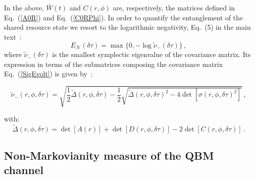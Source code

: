 \documentclass[prl,twocolumn,aps,floatfix,showpacs,tightenlines,superscriptaddress,amsmath,amssymb,amsfonts,10pt]{revtex4-1}
\begin{document}
In the above, $\bar{W}(t)$ and $C(r,\phi)$ are, respectively, the matrices defined in Eq.~(\ref{A0R}) and Eq.~(\ref{C0RPhi}).
In order to quantify the entanglement of the shared resource state we resort to the logarithmic negativity, Eq.~(5) in the main text~\cite{1751-8121-40-28-S01}:
\begin{displaymath}
E_{\mathcal{N}}(\delta\tau)=\max\{0,-\log\tilde{\nu}_-(\delta\tau)\} \, ,
\end{displaymath}
where $\tilde{\nu}_-(\delta\tau)$ is the smallest symplectic eigenvalue of the
covariance matrix. Its expression in terms of the submatrices composing the covariance matrix Eq.~(\ref{SigEvolt}) is given by~\cite{1751-8121-40-28-S01}:
\begin{widetext}
	\begin{equation}
	\tilde{\nu}_-(r,\phi,\delta\tau)=\sqrt{\!{\dfrac{1}{2}}\tilde{\Delta}(r,\phi,\delta\tau)-\dfrac{1}{2}\!\sqrt{\tilde{\Delta}(r,\phi,\delta\tau)^2
-4\det[\sigma(r,\phi,\delta\tau)^2]}} \, ,
	\end{equation}
\end{widetext}
with:
\begin{equation}
\tilde{\Delta}(r,\phi,\delta\tau)\!=\!\det[A(r)]+\det[D(r,\phi,\delta\tau)]\!-\!2\det[C(r,\phi,\delta\tau)] \, .
\end{equation}

\subsection{Non-Markovianity measure of the QBM channel}
\end{document}

